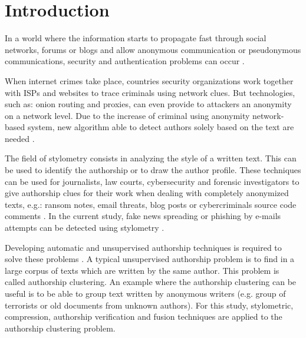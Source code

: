 
\chapter{Introduction \label{sec:introduction}}

In a world where the information starts to propagate fast through social networks, forums or blogs and allow anonymous communication or pseudonymous communications, security and authentication problems can occur \cite{automated_unsupervised} \cite{kocher_pan16}.

When internet crimes take place, countries security organizations work together with ISPs and websites to trace criminals using network clues.
But technologies, such as: onion routing and proxies, can even provide to attackers an anonymity on a network level.
Due to the increase of criminal using anonymity network-based system, new algorithm able to detect authors solely based on the text are needed \cite{automated_unsupervised} \cite{attribution_in_cyberspace}.

The field of stylometry consists in analyzing the style of a written text.
This can be used to identify the authorship or to draw the author profile.
These techniques can be used for journalists, law courts, cybersecurity and forensic investigators to give authorship clues for their work when dealing with completely anonymized texts, e.g.: ransom notes, email threats, blog posts or cybercriminals source code comments \cite{pan16_clustering_site}.
In the current study, fake news spreading or phishing by e-mails attempts can be detected using stylometry \cite{unine_pan20_fake_news}.

Developing automatic and unsupervised authorship techniques is required to solve these problems \cite{automated_unsupervised}.
A typical unsupervised authorship problem is to find in a large corpus of texts which are written by the same author.
This problem is called authorship clustering.
An example where the authorship clustering can be useful is to be able to group text written by anonymous writers (e.g. group of terrorists or old documents from unknown authors).
For this study, stylometric, compression, authorship verification and fusion techniques are applied to the authorship clustering problem.





